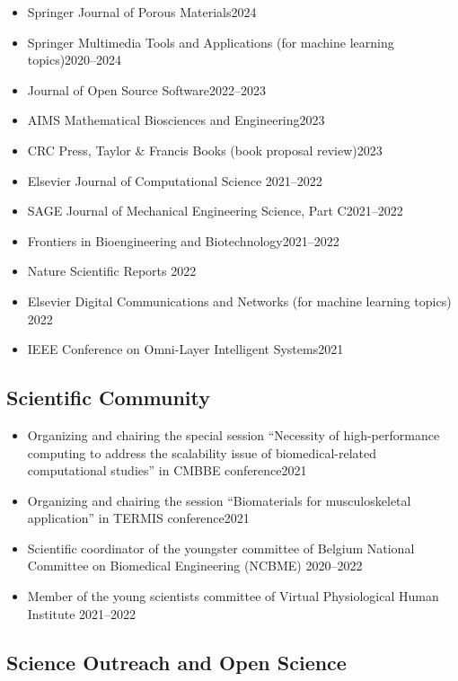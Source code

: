 \documentclass{cv}
\begin{document}
\begin{itemize}[itemsep=-0.2ex]
\item
Springer Journal of Porous Materials\hfill 2024
\item
Springer Multimedia Tools and Applications (for machine learning topics)\hfill 2020--2024
\item
Journal of Open Source Software\hfill 2022--2023
\item
AIMS Mathematical Biosciences and Engineering\hfill 2023
\item
CRC Press, Taylor \& Francis Books (book proposal review)\hfill 2023
\item
Elsevier Journal of Computational Science \hfill 2021--2022
\item
SAGE Journal of Mechanical Engineering Science, Part C\hfill 2021--2022
\item
Frontiers in Bioengineering and Biotechnology\hfill 2021--2022
\item
Nature Scientific Reports \hfill 2022
\item
Elsevier Digital Communications and Networks (for machine learning topics) \hfill 2022
\item
IEEE Conference on Omni-Layer Intelligent Systems\hfill 2021
\end{itemize}

\subsection{Scientific Community}

\begin{itemize}[itemsep=-0.2ex]
\item
Organizing and chairing the special session  ``Necessity of high-performance computing to address the scalability issue of biomedical-related computational studies'' in CMBBE conference\hfill 2021
\item
Organizing and chairing the session  ``Biomaterials for musculoskeletal application'' in TERMIS conference\hfill 2021
\item
Scientific coordinator of the youngster committee of Belgium National Committee on Biomedical Engineering (NCBME) \hfill 2020--2022
\item
Member of the young scientists committee of Virtual Physiological Human Institute \hfill 2021--2022
\end{itemize}

\subsection{Science Outreach and Open Science}
\end{document}

